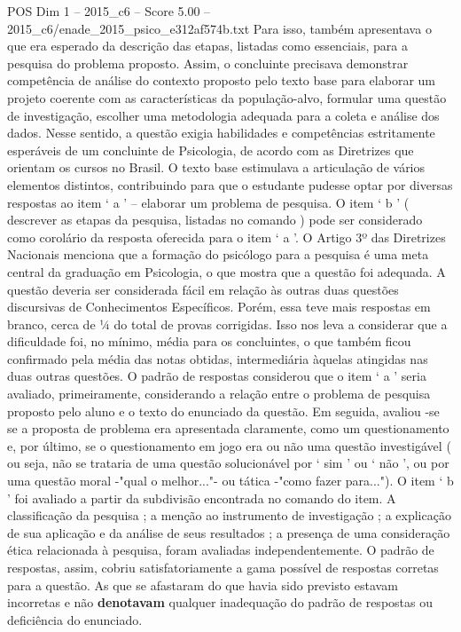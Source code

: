 \begin{textsample}{POS Dim 1 – 2015\_c6 – Score 5.00 – 2015\_c6/enade\_2015\_psico\_e312af574b.txt}
Para isso, também apresentava o que era esperado da descrição das etapas, listadas como essenciais, para a pesquisa do problema proposto.
Assim, o concluinte precisava demonstrar competência de análise do contexto proposto pelo texto base para elaborar um projeto coerente com as características da população-alvo, formular uma questão de investigação, escolher uma metodologia adequada para a coleta e análise dos dados.
Nesse sentido, a questão exigia habilidades e competências estritamente esperáveis de um concluinte de Psicologia, de acordo com as Diretrizes que orientam os cursos no Brasil.
O texto base estimulava a articulação de vários elementos distintos, contribuindo para que o estudante pudesse optar por diversas respostas ao item ‘ a ’ – elaborar um problema de pesquisa.
O item ‘ b ’ ( descrever as etapas da pesquisa, listadas no comando ) pode ser considerado como corolário da resposta oferecida para o item ‘ a ’.
O Artigo 3º das Diretrizes Nacionais menciona que a formação do psicólogo para a pesquisa é uma meta central da graduação em Psicologia, o que mostra que a questão foi adequada.
A questão deveria ser considerada fácil em relação às outras duas questões discursivas de Conhecimentos Específicos.
Porém, essa teve mais respostas em branco, cerca de ¼ do total de provas corrigidas.
Isso nos leva a considerar que a dificuldade foi, no mínimo, média para os concluintes, o que também ficou confirmado pela média das notas obtidas, intermediária àquelas atingidas nas duas outras questões.
O padrão de respostas considerou que o item ‘ a ’ seria avaliado, primeiramente, considerando a relação entre o problema de pesquisa proposto pelo aluno e o texto do enunciado da questão.
Em seguida, avaliou -se se a proposta de problema era apresentada claramente, como um questionamento e, por último, se o questionamento em jogo era ou não uma questão investigável ( ou seja, não se trataria de uma questão solucionável por ‘ sim ’ ou ‘ não ’, ou por uma questão moral -"qual o melhor..."- ou tática -"como fazer para...").
O item ‘ b ’ foi avaliado a partir da subdivisão encontrada no comando do item.
A classificação da pesquisa ; a menção ao instrumento de investigação ; a explicação de sua aplicação e da análise de seus resultados ; a presença de uma consideração ética relacionada à pesquisa, foram avaliadas independentemente.
O padrão de respostas, assim, cobriu satisfatoriamente a gama possível de respostas corretas para a questão.
As que se afastaram do que havia sido previsto estavam incorretas e não \textbf{denotavam} qualquer inadequação do padrão de respostas ou deficiência do enunciado.

\end{textsample}
